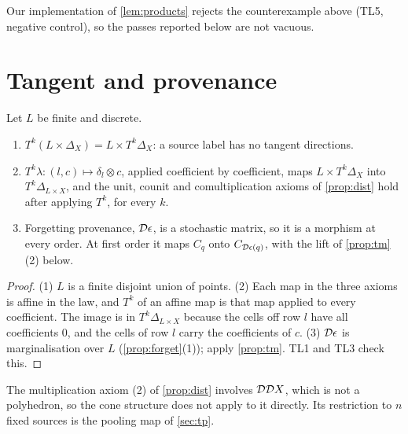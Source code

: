 \documentclass[11pt]{article}
\theoremstyle{definition}\newtheorem{definition}[theorem]{Definition}\newtheorem{remark}[theorem]{Remark}\newtheorem{example}[theorem]{Example}
\begin{document}
Our implementation of \cref{lem:products} rejects the counterexample above (TL5, negative control), so the passes reported below are not
vacuous.

\section{Tangent and provenance}\label{sec:tw}
\begin{proposition}\label{prop:tw}
Let $L$ be finite and discrete.
\begin{enumerate}
\item[(1)] $T^k(L\times\Delta_X)=L\times T^k\Delta_X$: a source label has no tangent directions.
\item[(2)] $T^k\lambda:(l,c)\mapsto\delta_l\otimes c$, applied coefficient by coefficient, maps $L\times T^k\Delta_X$ into $T^k\Delta_{L\times X}$, and
  the unit, counit and comultiplication axioms of \cref{prop:dist} hold after applying $T^k$, for every $k$.
\item[(3)] Forgetting provenance, $\mathcal D\epsilon$, is a stochastic matrix, so it is a morphism at every order. At first order it maps $C_q$
  onto $C_{\mathcal D\epsilon(q)}$, with the lift of \cref{prop:tm}(2) below.
\end{enumerate}
\end{proposition}

\begin{proof}
(1) $L$ is a finite disjoint union of points. (2) Each map in the three axioms is affine in the law, and $T^k$ of an affine map is that map
applied to every coefficient. The image is in $T^k\Delta_{L\times X}$ because the cells off row $l$ have all coefficients $0$, and the cells of
row $l$ carry the coefficients of $c$. (3) $\mathcal D\epsilon$ is marginalisation over $L$ (\cref{prop:forget}(1)); apply \cref{prop:tm}. TL1
and TL3 check this.
\end{proof}

The multiplication axiom (2) of \cref{prop:dist} involves $\mathcal D\mathcal D X$, which is not a polyhedron, so the cone structure does not apply to it
directly. Its restriction to $n$ fixed sources is the pooling map of \cref{sec:tp}.
\end{document}
